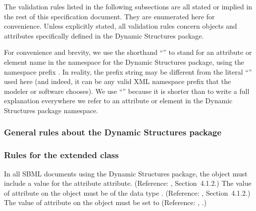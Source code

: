 The validation rules listed in the following subsections are all stated
or implied in the rest of this specification document.  They are
enumerated here for convenience. Unless explicitly stated, all
validation rules concern objects and attributes specifically defined in
the Dynamic Structures package.

For \notice convenience and brevity, we use the shorthand
``'' to stand for an attribute or element name 
in the namespace for the Dynamic Structures package, using
the namespace prefix .  In reality, the prefix string may be
different from the literal ``'' used here (and indeed, it
can be any valid XML namespace prefix that the modeler or software
chooses).  We use ``'' because it is shorter than to
write a full explanation everywhere we refer to an attribute or element
in the Dynamic Structures package namespace.

\subsubsection*{General rules about the Dynamic Structures package}
  

\subsubsection*{Rules for the extended  class} 
 {In all SBML documents using the Dynamic Structures package, the \SBML object must include a value for  the attribute  attribute.  (Reference: \sbmlthreecore, Section~4.1.2.)}
 {The value of attribute  on the \SBML object must be of the data type . (Reference: \sbmlthreecore, Section~4.1.2.) }
 {The value of attribute  on
  the \SBML object must be set to  (Reference: \sbmlthreedynamic, .) }

